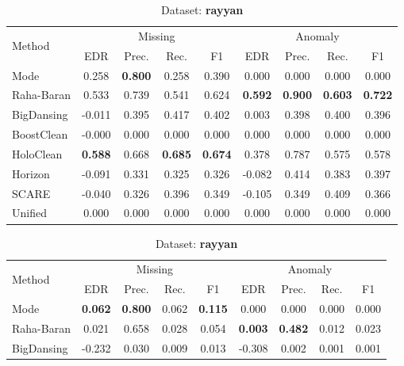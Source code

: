 \documentclass[10pt]{article} %
\numberwithin{equation}{section}
\begin{document}
\begin{table}[htbp]
\begin{subtable}[t]{0.492\linewidth}
\caption{Dataset: \textbf{hospital}}
\label{tab:q1-acc-hospital}
\centering
\begin{tabular}{lcccccccc}
\toprule
\multirow{2}{*}{Method} &
\multicolumn{4}{c}{Missing} &
\multicolumn{4}{c}{Anomaly}\\
\cmidrule(lr){2-5}\cmidrule(l){6-9}
 & EDR & Prec. & Rec. & F1
 & EDR & Prec. & Rec. & F1\\
\midrule
Mode        & 0.258 & \textbf{0.800} & 0.258 & 0.390 & 0.000 & 0.000 & 0.000 & 0.000 \\
Raha-Baran  & 0.533 & 0.739 & 0.541 & 0.624 & \textbf{0.592} & \textbf{0.900} & \textbf{0.603} & \textbf{0.722} \\
BigDansing  & -0.011 & 0.395 & 0.417 & 0.402 & 0.003 & 0.398 & 0.400 & 0.396 \\
BoostClean  & -0.000 & 0.000 & 0.000 & 0.000 & 0.000 & 0.000 & 0.000 & 0.000 \\
HoloClean   & \textbf{0.588} & 0.668 & \textbf{0.685} & \textbf{0.674} & 0.378 & 0.787 & 0.575 & 0.578 \\
Horizon     & -0.091 & 0.331 & 0.325 & 0.326 & -0.082 & 0.414 & 0.383 & 0.397 \\
SCARE       & -0.040 & 0.326 & 0.396 & 0.349 & -0.105 & 0.349 & 0.409 & 0.366 \\
Unified     & 0.000 & 0.000 & 0.000 & 0.000 & 0.000 & 0.000 & 0.000 & 0.000 \\
\bottomrule
\end{tabular}
\end{subtable}\hspace{0.01\linewidth}%
%
\begin{subtable}[t]{0.492\linewidth}
\caption{Dataset: \textbf{rayyan}}
\label{tab:q1-acc-rayyan}
\centering
\begin{tabular}{lcccccccc}
\toprule
\multirow{2}{*}{Method} &
\multicolumn{4}{c}{Missing} &
\multicolumn{4}{c}{Anomaly}\\
\cmidrule(lr){2-5}\cmidrule(l){6-9}
 & EDR & Prec. & Rec. & F1
 & EDR & Prec. & Rec. & F1\\
\midrule
Mode        & \textbf{0.062} & \textbf{0.800} & 0.062 & \textbf{0.115} & 0.000 & 0.000 & 0.000 & 0.000 \\
Raha-Baran  & 0.021 & 0.658 & 0.028 & 0.054 & \textbf{0.003} & \textbf{0.482} & 0.012 & 0.023 \\
BigDansing  & -0.232 & 0.030 & 0.009 & 0.013 & -0.308 & 0.002 & 0.001 & 0.001 \\

\end{tabular}
\end{subtable}
\end{table}
\end{document}
